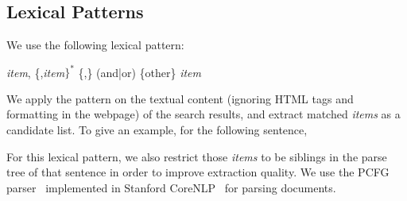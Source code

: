 \subsection{Lexical Patterns}
We use the following lexical pattern:
\begin{center}
\textit{item}, \{,\textit{item}$\}^*$ \{,\} (and|or) \{other\} \textit{item} 
\end{center}
We apply the pattern on the textual content (ignoring HTML tags and formatting in the webpage) of the search results, and extract matched \textit{items} as a candidate list. To give an example, for the following sentence,
\begin{center}
\end{center}

For this lexical pattern, we also restrict those \textit{items} to be siblings in the parse tree of that sentence in order to improve extraction quality. We use the PCFG parser~\cite{klein2003accurate} implemented in Stanford CoreNLP~\cite{manning2014stanford} for parsing documents.


